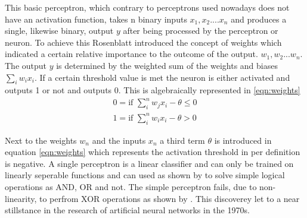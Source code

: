 This basic perceptron, which contrary to perceptrons used nowadays does not have an activation function, takes n binary
inputs $x_1 , x_2 .... x_n$ and produces a single, likewise binary, output $y$ after being processed by the perceptron or neuron.
To achieve this Rosenblatt introduced the concept of weights which indicated a certain relative importance to the outcome of the
output. $w_1 , w_2 ... w_n$. The output $y$ is determined by the weighted sum of the weights and biases $\sum_i w_ix_i $. If a certain
threshold value is met  the neuron is either activated and outputs 1 or not and outputs 0. This is algebraically represented in
\ref{eqn:weights}
\begin{subequations}
  \begin{align}
    0  = \mbox{if } \sum_i^n w_j x_i - \theta \leq 0 \\
    1 =  \mbox{if } \sum_i^n w_i x_i - \theta > 0
  \end{align}
  \label{eqn:weights}
\end{subequations}

Next to the weights $w_n$ and the inputs $x_n$ a third term $\theta$ is introduced in equation \ref{eqn:weights} which represents
the activation threshold in per definition is negative. A single perceptron is a linear classifier and can only be trained on
linearly seperable functions and can used as shown by \cite{rosenblatt1961} to solve simple logical operations as AND, OR and not.
The simple perceptron fails, due to non-linearity, to perfrom XOR operations as shown by \cite{marvin1969}. This discoverey let to
a near stillstance in the research of artificial neural networks in the 1970s.



